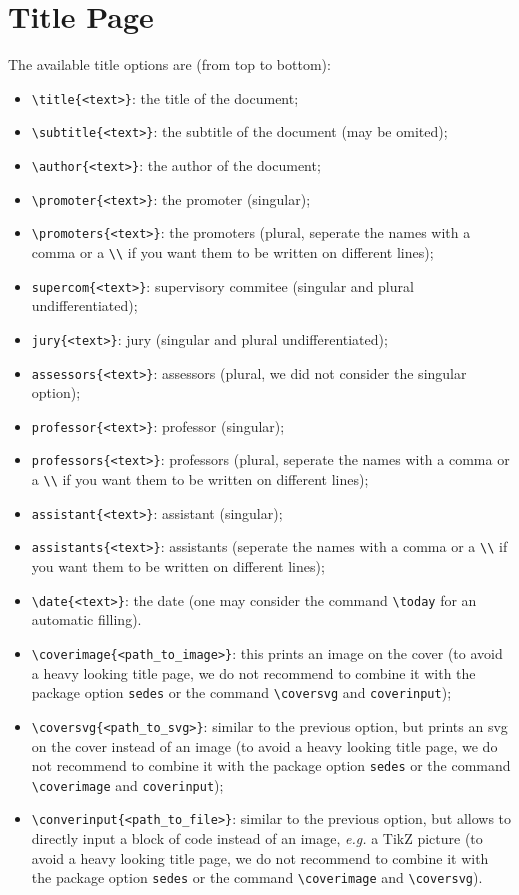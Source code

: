 \documentclass[oneside,a4paper,11pt,explicit]{book}
\begin{document}
\section{Title Page}
The available title options are (from top to bottom):
\begin{itemize}
    \item \verb|\title{<text>}|: the title of the document;
    \item \verb|\subtitle{<text>}|: the subtitle of the document (may be omited);
    \item \verb|\author{<text>}|: the author of the document;
    \item \verb|\promoter{<text>}|: the promoter (singular);
    \item \verb|\promoters{<text>}|: the promoters (plural, seperate the names with a comma or a \verb|\\| if you want them to be written on different lines);
    \item \verb|supercom{<text>}|: supervisory commitee  (singular and plural undifferentiated);
    \item \verb|jury{<text>}|: jury (singular and plural undifferentiated);
    \item \verb|assessors{<text>}|: assessors (plural, we did not consider the singular option);
    \item \verb|professor{<text>}|:  professor (singular);
    \item \verb|professors{<text>}|: professors (plural, seperate the names with a comma or a \verb|\\| if you want them to be written on different lines); 
    \item \verb|assistant{<text>}|: assistant (singular);
    \item \verb|assistants{<text>}|: assistants (seperate the names with a comma or a \verb|\\| if you want them to be written on different lines);
    \item \verb|\date{<text>}|: the date (one may consider the command \verb|\today| for an automatic filling).
    \item \verb|\coverimage{<path_to_image>}|: this prints an image on the cover (to avoid a heavy looking title page, we do not recommend to combine it with the package option \verb|sedes| or the command \verb|\coversvg| and \verb|coverinput|);
    \item \verb|\coversvg{<path_to_svg>}|: similar to the previous option, but prints an svg on the cover instead of an image (to avoid a heavy looking title page, we do not recommend to combine it with the package option \verb|sedes| or the command \verb|\coverimage| and \verb|coverinput|);
    \item \verb|\converinput{<path_to_file>}|: similar to the previous option, but allows to directly input a block of code instead of an image, \emph{e.g.} a TikZ picture (to avoid a heavy looking title page, we do not recommend to combine it with the package option \verb|sedes| or the command \verb|\coverimage| and \verb|\coversvg|).
\end{itemize}
\end{document}
